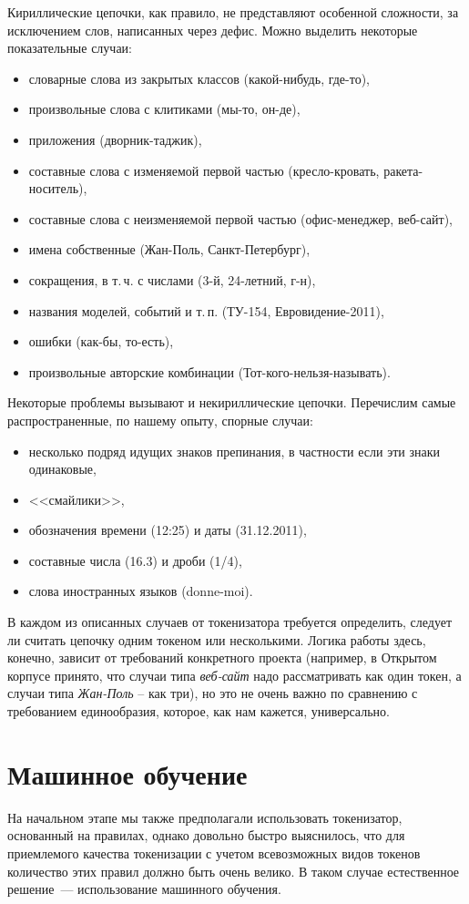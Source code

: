 \documentclass[a4paper]{article}
\begin{document}
Кириллические цепочки, как правило, не представляют особенной сложности, за исключением слов, написанных через дефис. Можно выделить некоторые показательные случаи:
\begin{itemize}
\item словарные слова из закрытых классов (какой-нибудь, где-то),
\item произвольные слова с клитиками (мы-то, он-де),
\item приложения (дворник-таджик),
\item составные слова с изменяемой первой частью (кресло-кровать, ракета-носитель),
\item составные слова с неизменяемой первой частью (офис-менеджер, веб-сайт),
\item имена собственные (Жан-Поль, Санкт-Петербург),
\item сокращения, в т.\,ч. с числами (3-й, 24-летний, г-н),
\item названия моделей, событий и т.\,п. (ТУ-154, Евровидение-2011),
\item ошибки (как-бы, то-есть),
\item произвольные авторские комбинации (Тот-кого-нельзя-называть).
\end{itemize}

Некоторые проблемы вызывают и некириллические цепочки. Перечислим самые распространенные, по нашему опыту, спорные случаи:
\begin{itemize}
\item несколько подряд идущих знаков препинания, в частности если эти знаки одинаковые,
\item{<<смайлики>>,}
\item обозначения времени (12:25) и даты (31.12.2011),
\item составные числа (16.3) и дроби (1/4),
\item слова иностранных языков (donne-moi).
\end{itemize}

В каждом из описанных случаев от токенизатора требуется определить, следует ли считать цепочку одним токеном или несколькими. Логика работы здесь, конечно, зависит от требований конкретного проекта (например, в Открытом корпусе принято, что случаи типа \textit{веб-сайт} надо рассматривать как один токен, а случаи типа \textit{Жан-Поль} – как три), но это не очень важно по сравнению с требованием единообразия, которое, как нам кажется, универсально.
\section{Машинное обучение}
На начальном этапе мы также предполагали использовать токенизатор, основанный на правилах, однако довольно быстро выяснилось, что для приемлемого качества токенизации с учетом всевозможных видов токенов количество этих правил должно быть очень велико. В таком случае естественное решение~--- использование машинного обучения.
\end{document}
